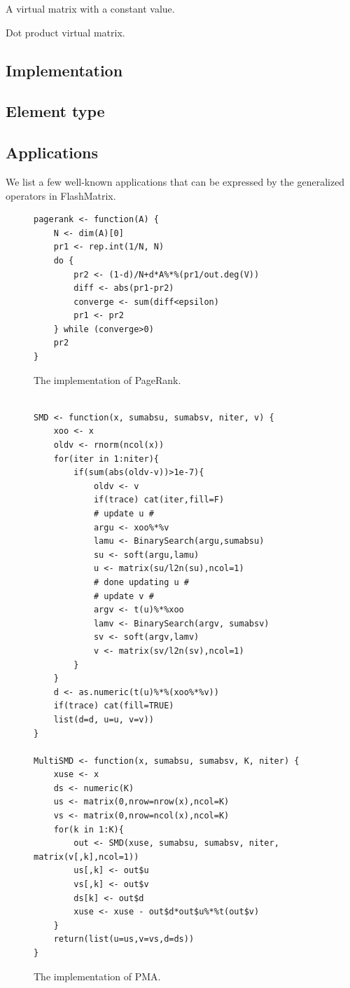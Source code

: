 A virtual matrix with a constant value.

Dot product virtual matrix.

\subsection{Implementation}

\subsection{Element type}

\subsection{Applications}

We list a few well-known applications that can be expressed by the generalized
operators in FlashMatrix.

\begin{figure}[t]
\begin{verbatim}
pagerank <- function(A) {
	N <- dim(A)[0]
	pr1 <- rep.int(1/N, N)
	do {
		pr2 <- (1-d)/N+d*A%*%(pr1/out.deg(V))
		diff <- abs(pr1-pr2)
		converge <- sum(diff<epsilon)
		pr1 <- pr2
	} while (converge>0)
	pr2
}
\end{verbatim}
\vspace{-5pt}
\caption{The implementation of PageRank.}
\label{fig:pagerank}
\end{figure}

\begin{figure}[t]
\begin{verbatim}

SMD <- function(x, sumabsu, sumabsv, niter, v) {
	xoo <- x
	oldv <- rnorm(ncol(x))
	for(iter in 1:niter){
		if(sum(abs(oldv-v))>1e-7){
			oldv <- v
			if(trace) cat(iter,fill=F)
			# update u #
			argu <- xoo%*%v
			lamu <- BinarySearch(argu,sumabsu)
			su <- soft(argu,lamu)
			u <- matrix(su/l2n(su),ncol=1)
			# done updating u #
			# update v #
			argv <- t(u)%*%xoo
			lamv <- BinarySearch(argv, sumabsv)
			sv <- soft(argv,lamv)
			v <- matrix(sv/l2n(sv),ncol=1)
		}
	}
	d <- as.numeric(t(u)%*%(xoo%*%v))
	if(trace) cat(fill=TRUE)
	list(d=d, u=u, v=v))
}

MultiSMD <- function(x, sumabsu, sumabsv, K, niter) {
	xuse <- x
	ds <- numeric(K)
	us <- matrix(0,nrow=nrow(x),ncol=K)
	vs <- matrix(0,nrow=ncol(x),ncol=K)
	for(k in 1:K){
		out <- SMD(xuse, sumabsu, sumabsv, niter, matrix(v[,k],ncol=1))
		us[,k] <- out$u
		vs[,k] <- out$v
		ds[k] <- out$d
		xuse <- xuse - out$d*out$u%*%t(out$v)
	}
	return(list(u=us,v=vs,d=ds))
}

\end{verbatim}
\vspace{-5pt}
\caption{The implementation of PMA.}
\label{fig:pma}
\end{figure}

